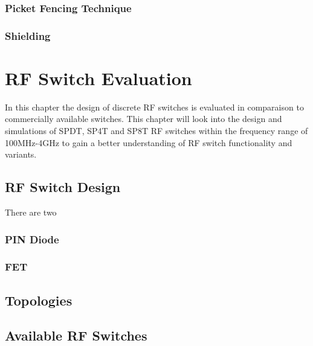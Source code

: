 \documentclass[12pt,openany,a4paper]{book}
\begin{document}
\subsection{Picket Fencing Technique}	\label{sec:picket}


\subsection{Shielding}










\chapter{RF Switch Evaluation}
In this chapter the design of discrete RF switches is evaluated in comparaison to commercially available switches. This chapter will look into the design and simulations of SPDT, SP4T and SP8T RF switches within the frequency range of 100MHz-4GHz to gain a better understanding of RF switch functionality and variants.
 
\section{RF Switch Design}
There are two 


\subsection{PIN Diode}


\subsection{FET}

\section{Topologies}



\section{Available RF Switches}

 
\end{document}
